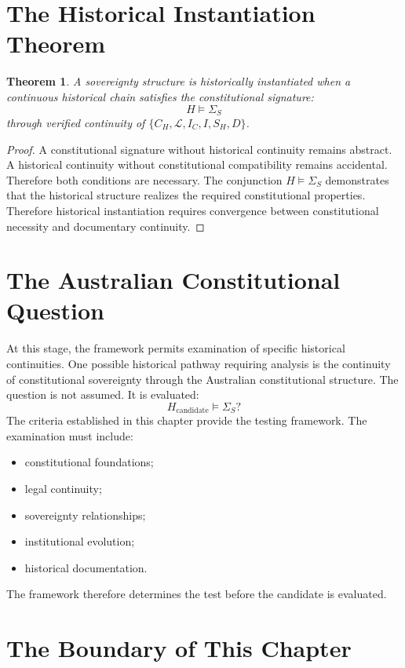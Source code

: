 \documentclass[11pt,openany]{book}
\theoremstyle{plain}
\newtheorem{theorem}{Theorem}[chapter]
\theoremstyle{definition}
\begin{document}
\section{The Historical Instantiation Theorem}

\begin{theorem}
A sovereignty structure is historically instantiated when a continuous historical chain satisfies the constitutional signature:
\[
H \models \Sigma_S
\]
through verified continuity of \(\{C_H, \mathcal{L}, I_C, I, S_H, D\}\).
\end{theorem}

\begin{proof}
A constitutional signature without historical continuity remains abstract. A historical continuity without constitutional compatibility remains accidental. Therefore both conditions are necessary. The conjunction \(H \models \Sigma_S\) demonstrates that the historical structure realizes the required constitutional properties. Therefore historical instantiation requires convergence between constitutional necessity and documentary continuity.
\end{proof}

\section{The Australian Constitutional Question}

At this stage, the framework permits examination of specific historical continuities. One possible historical pathway requiring analysis is the continuity of constitutional sovereignty through the Australian constitutional structure. The question is not assumed. It is evaluated:
\[
H_{\text{candidate}} \models \Sigma_S?
\]
The criteria established in this chapter provide the testing framework. The examination must include:
\begin{itemize}
\item constitutional foundations;
\item legal continuity;
\item sovereignty relationships;
\item institutional evolution;
\item historical documentation.
\end{itemize}
The framework therefore determines the test before the candidate is evaluated.

\section{The Boundary of This Chapter}
\end{document}
